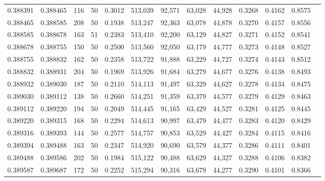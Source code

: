 \begin{tabular}{rrrrrrrrrrrrr}
0.388391 & 0.388465 &   116 &  50 &                                     0.3012 & 513,039 &  92,571 &  63,028 &  44,928 & 0.3268 & 0.4162 & 0.8575 \\
0.388465 & 0.388585 &   208 &  50 &                                     0.1938 & 513,247 &  92,363 &  63,078 &  44,878 & 0.3270 & 0.4157 & 0.8556 \\
0.388585 & 0.388678 &   163 &  51 &                                     0.2383 & 513,410 &  92,200 &  63,129 &  44,827 & 0.3271 & 0.4152 & 0.8541 \\
0.388678 & 0.388755 &   150 &  50 &                                     0.2500 & 513,560 &  92,050 &  63,179 &  44,777 & 0.3273 & 0.4148 & 0.8527 \\
0.388755 & 0.388832 &   162 &  50 &                                     0.2358 & 513,722 &  91,888 &  63,229 &  44,727 & 0.3274 & 0.4143 & 0.8512 \\
0.388832 & 0.388931 &   204 &  50 &                                     0.1969 & 513,926 &  91,684 &  63,279 &  44,677 & 0.3276 & 0.4138 & 0.8493 \\
0.388932 & 0.389030 &   187 &  50 &                                     0.2110 & 514,113 &  91,497 &  63,329 &  44,627 & 0.3278 & 0.4134 & 0.8475 \\
0.389030 & 0.389112 &   138 &  50 &                                     0.2660 & 514,251 &  91,359 &  63,379 &  44,577 & 0.3279 & 0.4129 & 0.8463 \\
0.389112 & 0.389220 &   194 &  50 &                                     0.2049 & 514,445 &  91,165 &  63,429 &  44,527 & 0.3281 & 0.4125 & 0.8445 \\
0.389220 & 0.389315 &   168 &  50 &                                     0.2294 & 514,613 &  90,997 &  63,479 &  44,477 & 0.3283 & 0.4120 & 0.8429 \\
0.389316 & 0.389393 &   144 &  50 &                                     0.2577 & 514,757 &  90,853 &  63,529 &  44,427 & 0.3284 & 0.4115 & 0.8416 \\
0.389394 & 0.389488 &   163 &  50 &                                     0.2347 & 514,920 &  90,690 &  63,579 &  44,377 & 0.3286 & 0.4111 & 0.8401 \\
0.389488 & 0.389586 &   202 &  50 &                                     0.1984 & 515,122 &  90,488 &  63,629 &  44,327 & 0.3288 & 0.4106 & 0.8382 \\
0.389587 & 0.389687 &   172 &  50 &                                     0.2252 & 515,294 &  90,316 &  63,679 &  44,277 & 0.3290 & 0.4101 & 0.8366 \\

\end{tabular}
